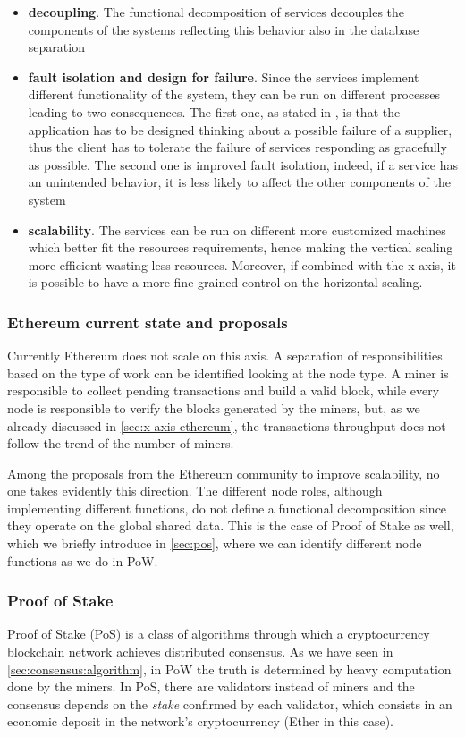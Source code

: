 \begin{itemize}
	\item \textbf{decoupling}. The functional decomposition of services
    decouples the components of the systems reflecting this behavior also in
    the database separation
	\item \textbf{fault isolation and design for failure}. Since the services
	implement different functionality of the system, they can be run on different
	processes leading to two consequences. The first one, as stated in
	\cite{bib:microservices-martin-fowler}, is that the application has to be
	designed thinking about a possible failure of a supplier, thus the client has
	to tolerate the failure of services responding as gracefully as possible. The
	second one is improved fault isolation, indeed, if a service has an unintended
	behavior, it is less likely to affect the other components of the system
	\item \textbf{scalability}. The services can be run on different more
	customized machines which better fit the resources requirements, hence making
	the vertical scaling more efficient wasting less resources. Moreover, if
	combined with the x-axis, it is possible to have a more fine-grained control
	on the horizontal scaling.
\end{itemize}

\subsubsection{Ethereum current state and proposals}
Currently Ethereum does not scale on this axis. A separation of responsibilities
based on the type of work can be identified looking at the node type. A miner is
responsible to collect pending transactions and build a valid block, while every
node is responsible to verify the blocks generated by the miners, but, as we
already discussed in \autoref{sec:x-axis-ethereum}, the transactions throughput
does not follow the trend of the number of miners.

Among the proposals from the Ethereum community to improve
scalability, no one takes evidently this direction. The different node roles,
although implementing different functions, do not define a functional
decomposition since they operate on the global shared data. This is the case of
Proof of Stake as well, which we briefly introduce in \autoref{sec:pos}, where
we can identify different node functions as we do in PoW.

\subsubsection{Proof of Stake}
\label{sec:pos}
Proof of Stake (PoS) is a class of algorithms through which a cryptocurrency
blockchain network achieves distributed consensus. As we have seen in
\autoref{sec:consensus:algorithm}, in PoW the truth is determined by heavy
computation done by the miners. In PoS, there are validators instead of miners
and the consensus depends on the \emph{stake} confirmed by each validator, which
consists in an economic deposit in the network's cryptocurrency (Ether in this
case).

